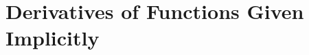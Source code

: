 \section{Derivatives of Functions Given Implicitly} \label{S:2.6.Implicit}



\newpage



\newpage



\newpage



\newpage

